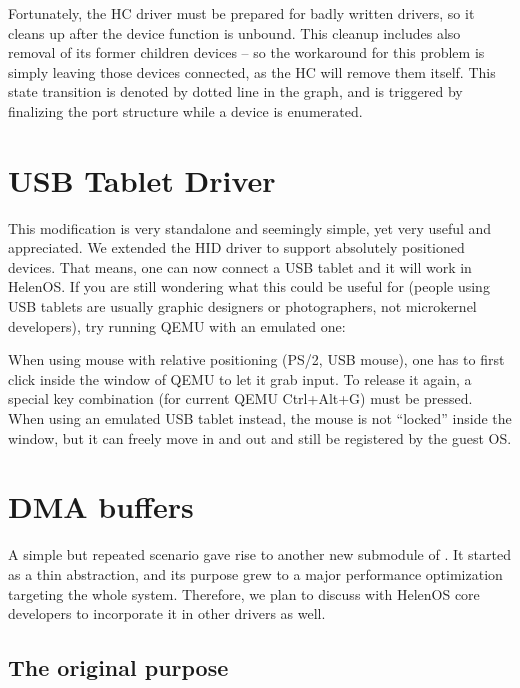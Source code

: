 Fortunately, the HC driver must be prepared for badly written drivers, so it
cleans up after the device function is unbound. This cleanup includes also
removal of its former children devices -- so the workaround for this problem is
simply leaving those devices connected, as the HC will remove them itself. This
state transition is denoted by dotted line in the graph, and is triggered by
finalizing the port structure while a device is enumerated.

\section{USB Tablet Driver}
\label{sec:usb-tablet-driver}

This modification is very standalone and seemingly simple, yet very useful and
appreciated. We extended the HID driver to support absolutely positioned
devices. That means, one can now connect a USB tablet and it will work in
HelenOS. If you are still wondering what this could be useful for (people using
USB tablets are usually graphic designers or photographers, not microkernel
developers), try running QEMU with an emulated one:


When using mouse with relative positioning (PS/2, USB mouse), one has to first
click inside the window of QEMU to let it grab input. To release it again,
a special key combination (for current QEMU Ctrl+Alt+G) must be pressed. When
using an emulated USB tablet instead, the mouse is not ``locked'' inside the
window, but it can freely move in and out and still be registered by the guest
OS.

\section{DMA buffers}
\label{sec:dma_bufs}

A simple but repeated scenario gave rise to another new submodule of
. It started as a thin abstraction, and its purpose grew to
a major performance optimization targeting the whole system. Therefore, we plan
to discuss with HelenOS core developers to incorporate it in other drivers as
well.

\subsection{The original purpose}

